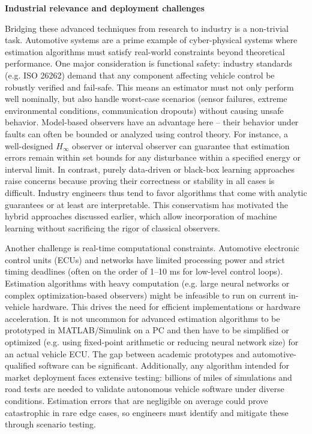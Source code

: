 \textbf{Industrial relevance and deployment challenges}

Bridging these advanced techniques from research to industry is a non-trivial task. Automotive systems are a prime example of cyber-physical systems where estimation algorithms must satisfy real-world constraints beyond theoretical performance. One major consideration is functional safety: industry standards (e.g. ISO 26262) demand that any component affecting vehicle control be robustly verified and fail-safe. This means an estimator must not only perform well nominally, but also handle worst-case scenarios (sensor failures, extreme environmental conditions, communication dropouts) without causing unsafe behavior. Model-based observers have an advantage here – their behavior under faults can often be bounded or analyzed using control theory. For instance, a well-designed $H_\infty$ observer or interval observer can guarantee that estimation errors remain within set bounds for any disturbance within a specified energy or interval limit. In contrast, purely data-driven or black-box learning approaches raise concerns because proving their correctness or stability in all cases is difficult. Industry engineers thus tend to favor algorithms that come with analytic guarantees or at least are interpretable. This conservatism has motivated the hybrid approaches discussed earlier, which allow incorporation of machine learning without sacrificing the rigor of classical observers.

Another challenge is real-time computational constraints. Automotive electronic control units (ECUs) and networks have limited processing power and strict timing deadlines (often on the order of 1–10 ms for low-level control loops). Estimation algorithms with heavy computation (e.g. large neural networks or complex optimization-based observers) might be infeasible to run on current in-vehicle hardware. This drives the need for efficient implementations or hardware acceleration. It is not uncommon for advanced estimation algorithms to be prototyped in MATLAB/Simulink on a PC and then have to be simplified or optimized (e.g. using fixed-point arithmetic or reducing neural network size) for an actual vehicle ECU. The gap between academic prototypes and automotive-qualified software can be significant. Additionally, any algorithm intended for market deployment faces extensive testing: billions of miles of simulations and road tests are needed to validate autonomous vehicle software under diverse conditions. Estimation errors that are negligible on average could prove catastrophic in rare edge cases, so engineers must identify and mitigate these through scenario testing.

